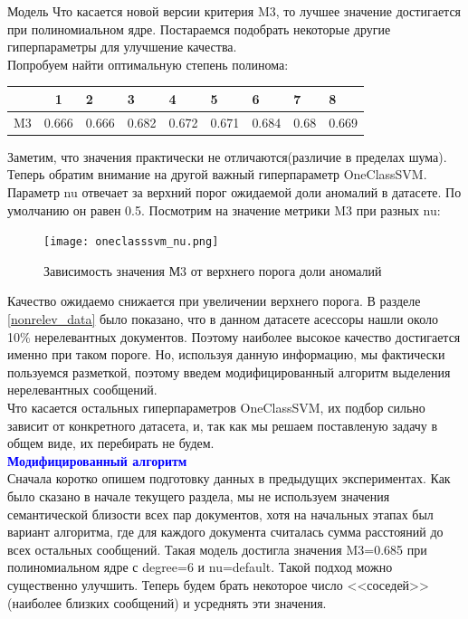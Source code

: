 \documentclass{article}
\begin{document}
\begin{section}{Модель}
 Что касается новой версии критерия M3, то лучшее значение достигается при полиномиальном ядре. Постараемся подобрать некоторые другие гиперпараметры для улучшение качества.\\

 Попробуем найти оптимальную степень полинома:
\begin{table}[!htb]
    \center
    \begin{tabular}{|l|l|l|l|l|l|l|l|l|}
    \hline
    \multicolumn{1}{|c|}{} & \multicolumn{1}{c|}{1} & 2     & 3     & 4     & 5     & 6     & 7    & 8     \\ \hline
    M3                     & 0.666                  & 0.666 & 0.682 & 0.672 & 0.671 & 0.684 & 0.68 & 0.669 \\ \hline
    \end{tabular}
\end{table}

Заметим, что значения практически не отличаются(различие в пределах шума).\\

Теперь обратим внимание на другой важный гиперпараметр OneClassSVM. Параметр nu отвечает за верхний порог ожидаемой доли аномалий в датасете. По умолчанию он равен 0.5. Посмотрим на значение метрики M3 при разных nu:

\begin{figure}[!htb]
    \center
        \texttt{[image: oneclasssvm\_nu.png]}
        \caption{Зависимость значения М3 от верхнего порога доли аномалий}
\end{figure}

Качество ожидаемо снижается при увеличении верхнего порога. В разделе \textcolor{cyan}{\ref{nonrelev_data}} было показано, что в данном датасете асессоры нашли около 10\% нерелевантных документов. Поэтому наиболее высокое качество достигается именно при таком пороге. Но, используя данную информацию, мы фактически пользуемся разметкой, поэтому введем модифицированный алгоритм выделения нерелевантных сообщений.\\

Что касается остальных гиперпараметров OneClassSVM, их подбор сильно зависит от конкретного датасета, и, так как мы решаем поставленую задачу в общем виде, их перебирать не будем.\\

\textbf{\textcolor{blue}{Модифицированный алгоритм}}\\
Сначала коротко опишем подготовку данных в предыдущих экспериментах. Как было сказано в начале текущего раздела, мы не используем значения семантической близости всех пар документов, хотя на начальных этапах был вариант алгоритма, где для каждого документа считалась сумма расстояний до всех остальных сообщений. Такая модель достигла значения M3=0.685 при полиномиальном ядре с degree=6 и nu=default. Такой подход можно существенно улучшить. Теперь будем брать некоторое число <<соседей>> (наиболее близких сообщений) и усреднять эти значения. \\


\end{section}
\end{document}
